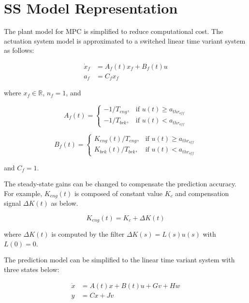 \documentclass[12pt]{report}
\begin{document}
\section{SS Model Representation}

The plant model for MPC is simplified to reduce computational cost. The actuation system model is approximated to a switched linear time variant system as follows:

\begin{equation}
\begin{aligned}
\dot{x}_f &= A_f(t)x_f + B_f(t)u \\
a_f &= C_fx_f
\end{aligned}
\end{equation}

where \(x_f \in \mathbb{R}\), \(n_f = 1\), and

\[
A_f(t) = 
\begin{cases} 
-1/T_{eng}, & \text{if } u(t) \geq a_{thr_{off}} \\
-1/T_{brk}, & \text{if } u(t) < a_{thr_{off}}
\end{cases}
\]

\[
B_f(t) = 
\begin{cases} 
K_{eng}(t)/T_{eng}, & \text{if } u(t) \geq a_{thr_{off}} \\
K_{brk}(t)/T_{brk}, & \text{if } u(t) < a_{thr_{off}}
\end{cases}
\]

and \(C_f = 1\).

The steady-state gains can be changed to compensate the prediction accuracy. For example, \(K_{eng}(t)\) is composed of constant value \(K_c\) and compensation signal \(\Delta K(t)\) as below.

\begin{equation}
K_{eng}(t) = K_c + \Delta K(t)
\end{equation}

where \(\Delta K(t)\) is computed by the filter \(\Delta K(s) = L(s)u(s)\) with \(L(0) = 0\). 

The prediction model can be simplified to the linear time variant system with three states below:

\begin{equation}
\begin{aligned}
\dot{x} &= A(t)x + B(t)u + Gv + Hw \\
y &= Cx + Jv
\end{aligned}
\end{equation}
\end{document}
